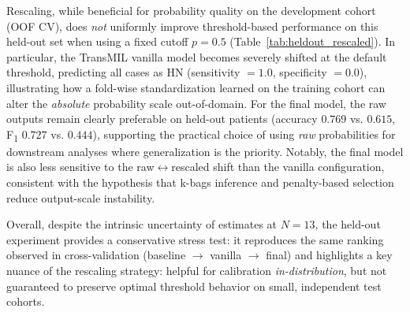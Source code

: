 \begin{table}[!t]
\centering
\caption{Held-out test set performance ($N=13$) using \textbf{rescaled} ensemble probabilities with a fixed threshold $p=0.5$.}
\label{tab:heldout_rescaled}
\end{table}

Rescaling, while beneficial for probability quality on the development cohort (OOF CV), does \emph{not} uniformly improve threshold-based performance on this held-out set when using a fixed cutoff $p=0.5$ (Table~\ref{tab:heldout_rescaled}). In particular, the TransMIL vanilla model becomes severely shifted at the default threshold, predicting all cases as HN (sensitivity $=1.0$, specificity $=0.0$), illustrating how a fold-wise standardization learned on the training cohort can alter the \emph{absolute} probability scale out-of-domain. For the final model, the raw outputs remain clearly preferable on held-out patients (accuracy $0.769$ vs. $0.615$, F\textsubscript{1} $0.727$ vs. $0.444$), supporting the practical choice of using \emph{raw} probabilities for downstream analyses where generalization is the priority. Notably, the final model is also less sensitive to the raw$\leftrightarrow$rescaled shift than the vanilla configuration, consistent with the hypothesis that k-bags inference and penalty-based selection reduce output-scale instability.

Overall, despite the intrinsic uncertainty of estimates at $N=13$, the held-out experiment provides a conservative stress test: it reproduces the same ranking observed in cross-validation (baseline $\rightarrow$ vanilla $\rightarrow$ final) and highlights a key nuance of the rescaling strategy: helpful for calibration \emph{in-distribution}, but not guaranteed to preserve optimal threshold behavior on small, independent test cohorts.


